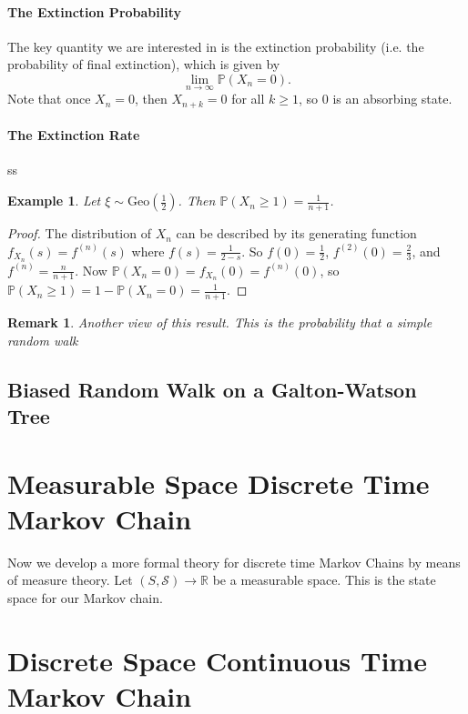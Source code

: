 \documentclass{article}
\newtheorem{Eg}{Example}[section]
\newtheorem*{Rk}{Remark}
\theoremstyle{definition}
\newcommand{\PP}{\mathbb{P}}
\begin{document}
\paragraph{The Extinction Probability} The key quantity we are interested in is the
extinction probability (i.e. the probability of final extinction), which is given by
\[ \lim_{n\to\infty}\PP(X_n=0).\]
Note that once $X_n=0$, then $X_{n+k}=0$ for all $k\geq 1$, so $0$ is an absorbing state.



\paragraph{The Extinction Rate} ss

\begin{Eg}
    Let $\xi\sim\text{Geo}(\frac{1}{2})$. Then $\PP(X_n \geq 1)=\frac{1}{n+1}$.
\end{Eg}
\begin{proof}
    The distribution of $X_n$ can be described by its generating function $f_{X_n}(s)=f^{(n)}(s)$
    where $f(s)=\frac{1}{2-s}$. So $f(0)=\frac{1}{2}$, $f^{(2)}(0)=\frac{2}{3}$, and $f^{(n)}=\frac{n}{n+1}$.
    Now $\PP(X_n=0)=f_{X_n}(0)=f^{(n)}(0)$, so $\PP(X_n \geq 1)=1-\PP(X_n = 0)=\frac{1}{n+1}$.
\end{proof}
\begin{Rk}
    Another view of this result.
    This is the probability that a simple random walk 
\end{Rk}

\subsection{Biased Random Walk on a Galton-Watson Tree}



\section{Measurable Space Discrete Time Markov Chain}
Now we develop a more formal theory for discrete time Markov Chains by means of measure theory.
Let $(S,\mathcal{S})\to\mathbb{R}$ be a measurable space. This is the state space for our Markov chain.


\section{Discrete Space Continuous Time Markov Chain}
\end{document}
